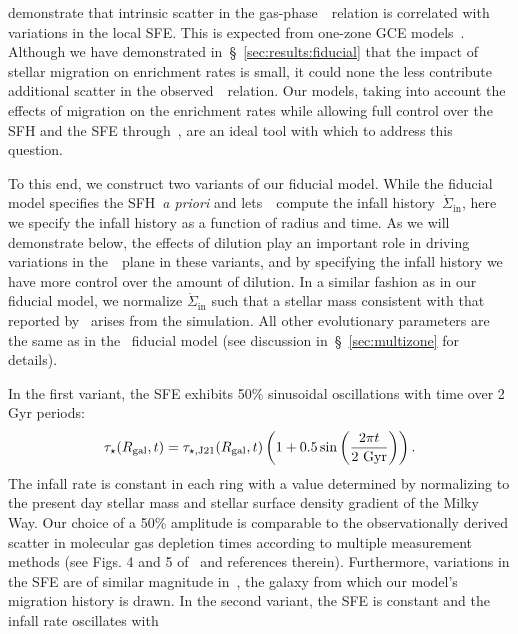 \documentclass[ms.tex]{subfiles}
\begin{document}
\citet{Schaefer2020} demonstrate that intrinsic scatter in the
gas-phase~\ohno~relation is correlated with variations in the local SFE.
This is expected from one-zone GCE models~\citep[e.g.][]{Molla2006,
Vincenzo2016a}.
Although we have demonstrated in~\S~\ref{sec:results:fiducial} that the impact
of stellar migration on enrichment rates is small, it could none the less
contribute additional scatter in the observed~\ohno~relation.
Our models, taking into account the effects of migration on the
enrichment rates while allowing full control over the SFH and the SFE
through~\vice, are an ideal tool with which to address this question.
\par
To this end, we construct two variants of our fiducial model.
While the fiducial model specifies the SFH~\textit{a priori} and
lets~\vice~compute the infall history~$\dot{\Sigma}_\text{in}$, here we specify
the infall history as a function of radius and time.
As we will demonstrate below, the effects of dilution play an important role in
driving variations in the~\ohno~plane in these variants, and by specifying the
infall history we have more control over the amount of dilution.
In a similar fashion as in our fiducial model, we normalize
$\dot{\Sigma}_\text{in}$ such that a stellar mass consistent with that reported
by~\citet{Licquia2015} arises from the simulation.
All other evolutionary parameters are the same as in the~\citet{Johnson2021}
fiducial model (see discussion in~\S~\ref{sec:multizone} for details).
\par
In the first variant, the SFE exhibits 50\% sinusoidal oscillations with time
over 2 Gyr periods:
\begin{equation}
\tau_\star(R_\text{gal}, t) = \tau_{\star,\text{J21}}(R_\text{gal}, t)
\left(1 + 0.5\sin\left(\frac{2\pi t}{2~\text{Gyr}}\right)\right).
\label{eq:sfe_var}
\end{equation}
The infall rate is constant in each ring with a value determined by normalizing
to the present day stellar mass and stellar surface density gradient of the
Milky Way.
Our choice of a 50\% amplitude is comparable to the observationally derived
scatter in molecular gas depletion times according to multiple measurement
methods (see Figs. 4 and 5 of~\citealp{Tacconi2018} and references therein).
Furthermore, variations in the SFE are of similar magnitude in~\hsim, the
galaxy from which our model's migration history is drawn.
In the second variant, the SFE is constant and the infall rate oscillates with
\end{document}
